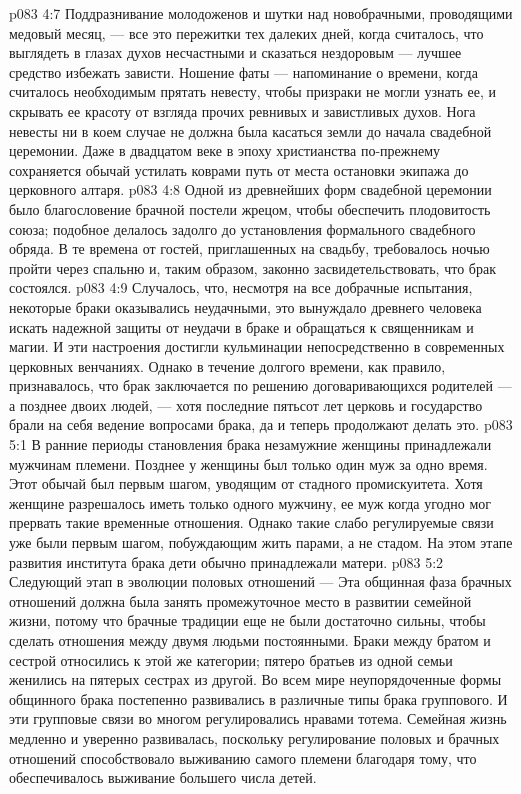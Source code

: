\vs p083 4:7 Поддразнивание молодоженов и шутки над новобрачными, проводящими медовый месяц, --- все это пережитки тех далеких дней, когда считалось, что выглядеть в глазах духов несчастными и сказаться нездоровым --- лучшее средство избежать зависти. Ношение фаты --- напоминание о времени, когда считалось необходимым прятать невесту, чтобы призраки не могли узнать ее, и скрывать ее красоту от взгляда прочих ревнивых и завистливых духов. Нога невесты ни в коем случае не должна была касаться земли до начала свадебной церемонии. Даже в двадцатом веке в эпоху христианства по\hyp{}прежнему сохраняется обычай устилать коврами путь от места остановки экипажа до церковного алтаря.
\vs p083 4:8 Одной из древнейших форм свадебной церемонии было благословение брачной постели жрецом, чтобы обеспечить плодовитость союза; подобное делалось задолго до установления формального свадебного обряда. В те времена от гостей, приглашенных на свадьбу, требовалось ночью пройти через спальню и, таким образом, законно засвидетельствовать, что брак состоялся.
\vs p083 4:9 Случалось, что, несмотря на все добрачные испытания, некоторые браки оказывались неудачными, это вынуждало древнего человека искать надежной защиты от неудачи в браке и обращаться к священникам и магии. И эти настроения достигли кульминации непосредственно в современных церковных венчаниях. Однако в течение долгого времени, как правило, признавалось, что брак заключается по решению договаривающихся родителей --- а позднее двоих людей, --- хотя последние пятьсот лет церковь и государство брали на себя ведение вопросами брака, да и теперь продолжают делать это.
\vs p083 5:1 В ранние периоды становления брака незамужние женщины принадлежали мужчинам племени. Позднее у женщины был только один муж за одно время. Этот обычай  был первым шагом, уводящим от стадного промискуитета. Хотя женщине разрешалось иметь только одного мужчину, ее муж когда угодно мог прервать такие временные отношения. Однако такие слабо регулируемые связи уже были первым шагом, побуждающим жить парами, а не стадом. На этом этапе развития института брака дети обычно принадлежали матери.
\vs p083 5:2 Следующий этап в эволюции половых отношений ---  Эта общинная фаза брачных отношений должна была занять промежуточное место в развитии семейной жизни, потому что брачные традиции еще не были достаточно сильны, чтобы сделать отношения между двумя людьми постоянными. Браки между братом и сестрой относились к этой же категории; пятеро братьев из одной семьи женились на пятерых сестрах из другой. Во всем мире неупорядоченные формы общинного брака постепенно развивались в различные типы брака группового. И эти групповые связи во многом регулировались нравами тотема. Семейная жизнь медленно и уверенно развивалась, поскольку регулирование половых и брачных отношений способствовало выживанию самого племени благодаря тому, что обеспечивалось выживание большего числа детей.
